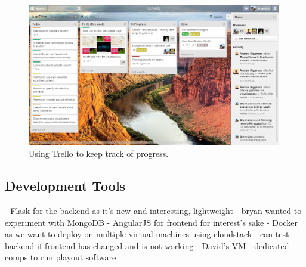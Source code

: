 \documentclass[a4paper]{article}
\begin{document}
\begin{figure}[h]
  \centering
    \includegraphics[width = 0.99\textwidth]{./planning/trello.jpg}
   
  \caption{Using Trello to keep track of progress.}
  \label{fig:trello}
\end{figure}

\subsection{Development Tools}
 	- Flask for the backend as it's new and interesting, lightweight
	- bryan wanted to experiment with MongoDB
	- AngularJS for frontend for interest's sake
	- Docker as we want to deploy on multiple virtual machines using cloudstack
	- can test backend if frontend has changed and is not working
  - David's VM
	- dedicated comps to run playout software
\end{document}
